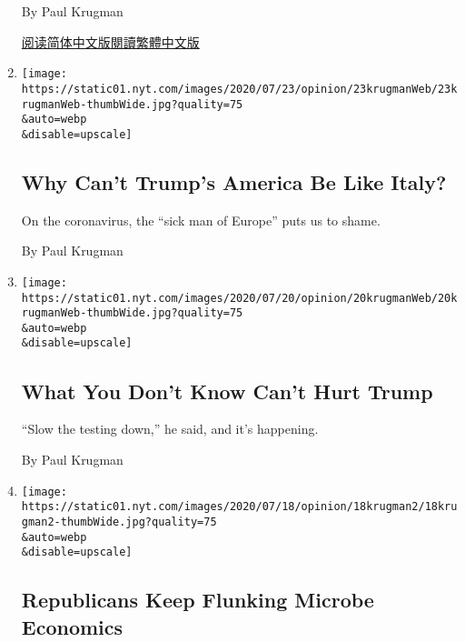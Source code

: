 \begin{enumerate}
  By Paul Krugman

  \href{https://cn.nytimes.com/opinion/20200728/us-republicans-coronavirus/}{阅读简体中文版}\href{https://cn.nytimes.com/opinion/20200728/us-republicans-coronavirus/zh-hant/}{閱讀繁體中文版}
\item
  \href{/2020/07/23/opinion/us-italy-coronavirus.html}{}

  \texttt{[image: https://static01.nyt.com/images/2020/07/23/opinion/23krugmanWeb/23krugmanWeb-thumbWide.jpg?quality=75\\\&auto=webp\\\&disable=upscale]}

  \hypertarget{why-cant-trumps-america-be-like-italy}{%
  \subsection{Why Can't Trump's America Be Like
  Italy?}\label{why-cant-trumps-america-be-like-italy}}

  On the coronavirus, the ``sick man of Europe'' puts us to shame.

  By Paul Krugman
\item
  \href{/2020/07/20/opinion/trump-coronavirus-testing.html}{}

  \texttt{[image: https://static01.nyt.com/images/2020/07/20/opinion/20krugmanWeb/20krugmanWeb-thumbWide.jpg?quality=75\\\&auto=webp\\\&disable=upscale]}

  \hypertarget{what-you-dont-know-cant-hurt-trump}{%
  \subsection{What You Don't Know Can't Hurt
  Trump}\label{what-you-dont-know-cant-hurt-trump}}

  ``Slow the testing down,'' he said, and it's happening.

  By Paul Krugman
\item
  \href{/2020/07/18/opinion/republicans-keep-flunking-microbe-economics.html}{}

  \texttt{[image: https://static01.nyt.com/images/2020/07/18/opinion/18krugman2/18krugman2-thumbWide.jpg?quality=75\\\&auto=webp\\\&disable=upscale]}

  \hypertarget{republicans-keep-flunking-microbe-economics}{%
  \subsection{Republicans Keep Flunking Microbe
  Economics}\label{republicans-keep-flunking-microbe-economics}}


\end{enumerate}
